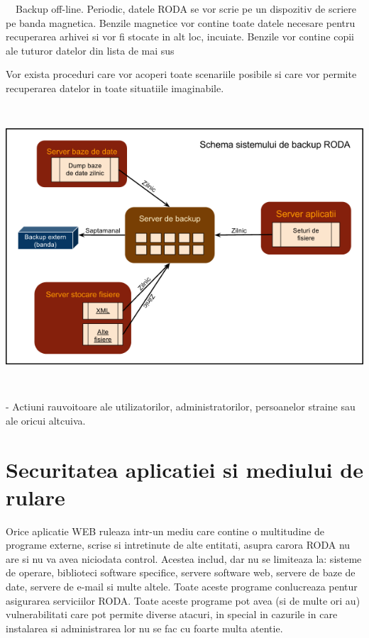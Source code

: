 {\sffamily\color{black}
\ \ Backup off-line. Periodic, datele RODA se vor scrie pe un dispozitiv de scriere pe banda magnetica. Benzile
magnetice vor contine toate datele necesare pentru recuperarea arhivei si vor fi stocate in alt loc, incuiate. Benzile
vor contine copii ale tuturor datelor din lista de mai sus }

{\sffamily\color{black}
Vor exista proceduri care vor acoperi toate scenariile posibile si care vor permite recuperarea datelor in toate
situatiile imaginabile.}


\bigskip

 \includegraphics[width=6.2709in,height=4.1354in]{SecuritateaarhiveiRODA-img001.png} 


\bigskip

{\sffamily\color{black}
{}- Actiuni rauvoitoare ale utilizatorilor, administratorilor, persoanelor straine sau ale oricui altcuiva. }
\bigskip

\section{Securitatea aplicatiei si mediului de rulare}
\bigskip

{\sffamily\color{black}
Orice aplicatie WEB ruleaza intr-un mediu care contine o multitudine de programe externe, scrise si intretinute de alte
entitati, asupra carora RODA nu are si nu va avea niciodata control. Acestea includ, dar nu se limiteaza la: sisteme de
operare, biblioteci software specifice, servere software web, servere de baze de date, servere de e-mail si multe
altele. Toate aceste programe conlucreaza pentur asigurarea serviciilor RODA. Toate aceste programe pot avea (si de
multe ori au) vulnerabilitati care pot permite diverse atacuri, in special in cazurile in care instalarea si
administrarea lor nu se fac cu foarte multa atentie.}


